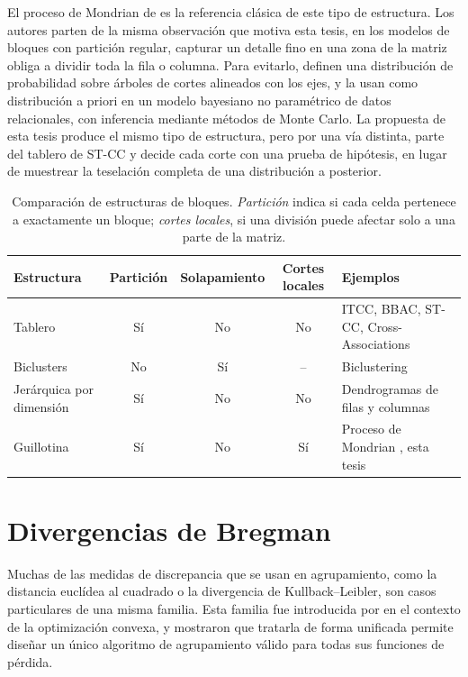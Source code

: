 El proceso de Mondrian de \cite{Roy2008} es la referencia clásica de este tipo de
estructura. Los autores parten de la misma observación que motiva esta tesis, en
los modelos de bloques con partición regular, capturar un detalle fino en una
zona de la matriz obliga a dividir toda la fila o columna. Para evitarlo, definen
una distribución de probabilidad sobre árboles de cortes alineados con los ejes, y
la usan como distribución a priori en un modelo bayesiano no paramétrico de datos
relacionales, con inferencia mediante métodos de Monte Carlo. La propuesta de esta
tesis produce el mismo tipo de estructura, pero por una vía distinta, parte del
tablero de ST-CC y decide cada corte con una prueba de hipótesis, en lugar de
muestrear la teselación completa de una distribución a posterior.

\begin{table}[ht]
  \centering
  {\footnotesize
  \begin{tabular}{@{}l c c c >{\raggedright\arraybackslash}p{}@{}}
    \toprule
    \textbf{Estructura} & \textbf{Partición} & \textbf{Solapamiento} &
    \textbf{Cortes locales} & \textbf{Ejemplos} \\
    \midrule
    Tablero & Sí & No & No & ITCC, BBAC, ST-CC, Cross-Associations \\
    Biclusters & No & Sí & -- & Biclustering \cite{Castanho2024} \\
    Jerárquica por dimensión & Sí & No & No & Dendrogramas de filas y columnas \\
    Guillotina & Sí & No & Sí & Proceso de Mondrian \cite{Roy2008}, esta tesis \\
    \bottomrule
  \end{tabular}
  }
  \caption{Comparación de estructuras de bloques. \emph{Partición} indica si cada
  celda pertenece a exactamente un bloque; \emph{cortes locales}, si una división
  puede afectar solo a una parte de la matriz.}
  \label{tab:estructuras}
\end{table}

\section{Divergencias de Bregman}\label{sec:bregman}

Muchas de las medidas de discrepancia que se usan en agrupamiento, como la
distancia euclídea al cuadrado o la divergencia de Kullback--Leibler, son casos
particulares de una misma familia. Esta familia fue introducida por
\cite{Bregman1967} en el contexto de la optimización convexa, y
\cite{Banerjee2005} mostraron que tratarla de forma unificada permite diseñar un
único algoritmo de agrupamiento válido para todas sus funciones de pérdida.

